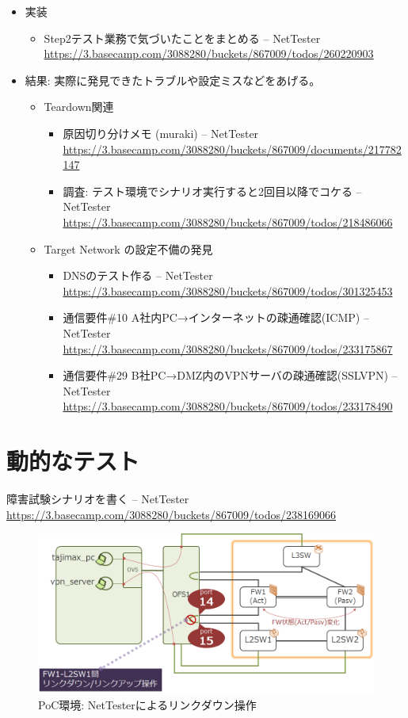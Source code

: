 \begin{itemize}
 \item 実装
       \begin{itemize}
        \item Step2テスト業務で気づいたことをまとめる – NetTester \url{https://3.basecamp.com/3088280/buckets/867009/todos/260220903}
       \end{itemize}
 \item 結果: 実際に発見できたトラブルや設定ミスなどをあげる。

       \begin{itemize}
        \item Teardown関連
              \begin{itemize}
               \item 原因切り分けメモ (muraki) – NetTester \url{https://3.basecamp.com/3088280/buckets/867009/documents/217782147}
               \item 調査: テスト環境でシナリオ実行すると2回目以降でコケる – NetTester \url{https://3.basecamp.com/3088280/buckets/867009/todos/218486066}
              \end{itemize}
        \item Target Network の設定不備の発見
              \begin{itemize}
               \item DNSのテスト作る – NetTester \url{https://3.basecamp.com/3088280/buckets/867009/todos/301325453}
               \item 通信要件\#10 A社内PC→インターネットの疎通確認(ICMP) – NetTester \url{https://3.basecamp.com/3088280/buckets/867009/todos/233175867}
               \item 通信要件\#29 B社PC→DMZ内のVPNサーバの疎通確認(SSLVPN) – NetTester \url{https://3.basecamp.com/3088280/buckets/867009/todos/233178490}
              \end{itemize}
       \end{itemize}
\end{itemize}

\section{動的なテスト}

障害試験シナリオを書く – NetTester \url{https://3.basecamp.com/3088280/buckets/867009/todos/238169066}

\begin{figure}[h]
 \centering
 \includegraphics[scale=0.6]{img/poc-env-linkdown.png}
 \caption{PoC環境: NetTesterによるリンクダウン操作}
 \label{fig:poc-env-linkdown}
\end{figure}

